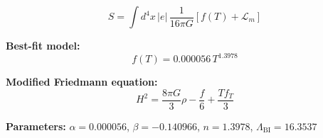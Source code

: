 
\begin{equation}
  S = \int d^4x \, |e| \, \frac{1}{16\pi G} \left[ f(T) + \mathcal{L}_m \right]
\end{equation}

\textbf{Best-fit model:}
\begin{equation}
  f(T) = 0.000056 \, T^{1.3978}
\end{equation}

\textbf{Modified Friedmann equation:}
\begin{equation}
  H^2 = \frac{8\pi G}{3} \rho - \frac{f}{6} + \frac{T f_T}{3}
\end{equation}

\textbf{Parameters:}
$\alpha = 0.000056$, \quad
$\beta = -0.140966$, \quad
$n = 1.3978$, \quad
$\Lambda_{\text{BI}} = 16.3537$